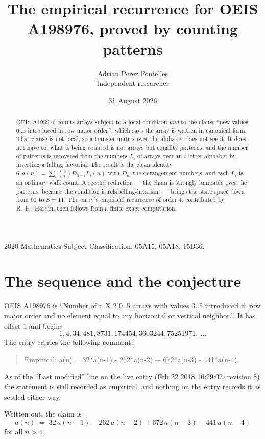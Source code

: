 \documentclass[11pt,a4paper]{article}
\title{The empirical recurrence for OEIS A198976, proved by counting patterns}
\author{Adrian Perez Fontelles\\ \small Independent researcher}
\date{31 August 2026}
\theoremstyle{plain}
\theoremstyle{definition}
\begin{document}
\maketitle

\begin{abstract}
OEIS A198976 counts arrays subject to a local condition \emph{and} to the clause ``new values
$0..5$ introduced in row major order'', which says the array is written in canonical
form. That clause is not local, so a transfer matrix over the alphabet does not see it. It
does not have to: what is being counted is not arrays but equality patterns, and the number
of patterns is recovered from the numbers $L_i$ of arrays over an $i$-letter alphabet by
inverting a falling factorial. The result is the clean identity
$6!\,a(n)=\sum_i\binom{6}{i}D_{6-i}L_i(n)$ with $D_m$ the derangement numbers,
and each $L_i$ is an ordinary walk count. A second reduction --- the chain is strongly
lumpable over the patterns, because the condition is relabelling-invariant --- brings the
state space down from $91$ to $S=11$. The entry's empirical recurrence of order
$4$, contributed by R.~H.~Hardin, then follows from a finite exact computation.
\end{abstract}

\noindent\small 2020 Mathematics Subject Classification. 05A15, 05A18, 15B36.\normalsize

\section{The sequence and the conjecture}

OEIS A198976 is ``Number of n X 2 0..5 arrays with values 0..5 introduced in row major order and no element equal to any horizontal or vertical neighbor.''. It has offset $1$ and begins
\[
1, 4, 34, 481, 8731, 174454, 3603244, 75251971,\ \dots
\]
The entry carries the following comment:
\begin{quote}\small
Empirical: a(n) = 32*a(n-1) - 262*a(n-2) + 672*a(n-3) - 441*a(n-4).
\end{quote}
As of the ``Last modified'' line on the live entry (Feb 22 2018 16:29:02, revision 8) the statement is
still recorded as empirical, and nothing on the entry records it as settled either way.

Written out, the claim is
\begin{equation}\label{eq:conj}
a(n)\;=\;32\,a(n-1) - 262\,a(n-2) + 672\,a(n-3) - 441\,a(n-4)
\end{equation}
for all $n>4$.
\end{document}
